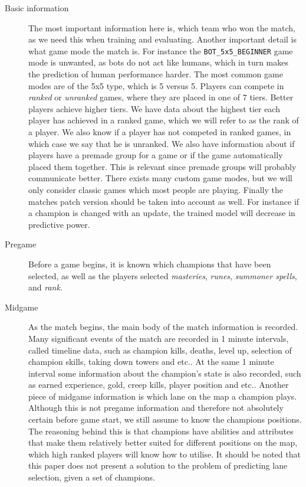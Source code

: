 \begin{description}
\item[Basic information] 
The most important information here is, which team who won the match, as we need this when training and evaluating. Another important detail is what game mode the match is. For instance the \texttt{BOT\_5x5\_BEGINNER} game mode is unwanted, as bots do not act like humans, which in turn makes the prediction of human performance harder. The most common game modes are of the 5x5 type, which is 5 versus 5. Players can compete in \emph{ranked} or \emph{unranked} games, where they are placed in one of 7 tiers. Better players achieve higher tiers. We have data about the highest tier each player has achieved in a ranked game, which we will refer to as the rank of a player. We also know if a player has not competed in ranked games, in which case we say that he is unranked. We also have information about if players have a premade group for a game or if the game automatically placed them together. This is relevant since premade groups will probably communicate better. There exists many custom game modes, but we will only consider classic games which most people are playing. Finally the matches patch version should be taken into account as well. For instance if a champion is changed with an update, the trained model will decrease in predictive power.
\item[Pregame]
Before a game begins, it is known which champions that have been selected, as well as the players selected \textit{masteries}, \emph{runes}, \emph{summoner spells}, and \emph{rank}. %
\item[Midgame]
As the match begins, the main body of the match information is recorded. Many significant events of the match are recorded in 1 minute intervals, called timeline data, such as champion kills, deaths, level up, selection of champion skills, taking down towers and etc.. At the same 1 minute interval some information about the champion's state is also recorded, such as earned experience, gold, creep kills, player position and etc.. Another piece of midgame information is which lane on the map a champion plays. Although this is not pregame information and therefore not absolutely certain before game start, we still assume to know the champions positions. The reasoning behind this is that champions have abilities and attributes that make them relatively better suited for different positions on the map, which high ranked players will know how to utilise. It should be noted that this paper does not present a solution to the problem of predicting lane selection, given a set of champions.
\end{description}

